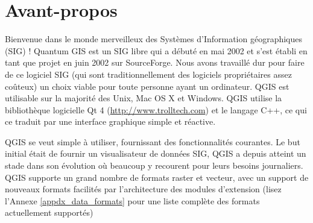 \section{Avant-propos}\label{label_forward}
\setcounter{page}{1}



Bienvenue dans le monde merveilleux des Syst\`emes d'Information g\'eographiques (SIG) ! Quantum GIS est un SIG libre qui a d\'ebut\'e en mai 2002 et s'est \'etabli en tant que projet en juin 2002 sur SourceForge. Nous avons travaill\'e dur pour faire de ce logiciel SIG (qui sont traditionnellement des logiciels propri\'etaires assez co\^uteux) un choix viable pour toute personne ayant un ordinateur. QGIS est utilisable sur la majorit\'e des Unix, Mac OS X et Windows. QGIS utilise la biblioth\`eque logicielle Qt 4 (\url{http://www.trolltech.com}) et le langage C++, ce qui ce traduit par une interface graphique simple et r\'eactive.


QGIS se veut simple \`a utiliser, fournissant des fonctionnalit\'es courantes. Le but initial \'etait de fournir un visualisateur de donn\'ees SIG, QGIS a depuis atteint un stade dans son \'evolution o\`u beaucoup y recourent pour leurs besoins journaliers. QGIS supporte un grand nombre de formats raster et vecteur, avec un support de nouveaux formats facilit\'es par l'architecture des modules d'extension (lisez l'Annexe \ref{appdx_data_formats} pour une liste compl\`ete des formats actuellement support\'es)

